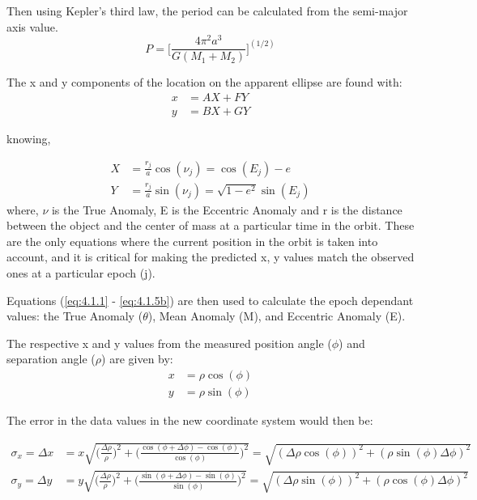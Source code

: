 \documentclass[10pt,preprint]{aastex}
\begin{document}
Then using Kepler's third law, the period can be calculated from the semi-major axis value.
\begin{equation}\label{eq:28}
P = \bigg[\frac{4\pi^2a^3}{G(M_1+M_2)} \bigg]^{(1/2)}
\end{equation}

The x and y components of the location on the apparent ellipse are found with:
\begin{subequations}
\begin{align}\label{eq:28-1a}
x& = AX+FY\\
\label{eq:28-1b}
y& = BX + GY
\end{align}
\end{subequations}

knowing,

\begin{subequations}
\begin{align}\label{eq:28-1.5a}
X& = \frac{r_j}{a}\cos(\nu_j) = \cos(E_j)-e\\
\label{eq:28-1.5b}
Y& = \frac{r_j}{a}\sin(\nu_j) = \sqrt{1-e^2}\sin(E_j) 
\end{align}
\end{subequations}
where, $\nu$ is the True Anomaly, E is the Eccentric Anomaly and r is the distance between the object and the center of mass at a particular time in the orbit.  These are the only equations where the current position in the orbit is taken into account, and it is critical for making the predicted x, y values match the observed ones at a particular epoch (j).

Equations (\ref{eq:4.1.1} - \ref{eq:4.1.5b}) are then used to calculate the epoch dependant values: the True Anomaly ($\theta$), Mean Anomaly (M), and Eccentric Anomaly (E).

The respective x and y values from the measured position angle ($\phi$) and separation angle ($\rho$) are given by:
\begin{subequations}
\begin{align}\label{eq:28-2a}
x& = \rho \cos(\phi)\\
\label{eq:28-2b}
y& = \rho \sin(\phi)
\end{align}
\end{subequations}

The error in the data values in the new coordinate system would then be:

\begin{subequations}
\begin{align}\label{eq:28-3a}
\sigma_{x}=\Delta x& = x \sqrt{\bigg(\frac{\Delta\rho}{\rho}\bigg)^2 +\bigg(\frac{\cos(\phi+\Delta\phi)-\cos(\phi)}{\cos(\phi)}\bigg)^2} = \sqrt{(\Delta \rho \cos(\phi))^2+(\rho \sin(\phi)\Delta \phi)^2}\\
\label{eq:28-3b}
\sigma_{y}=\Delta y& = y \sqrt{\bigg(\frac{\Delta\rho}{\rho}\bigg)^2 +\bigg(\frac{\sin(\phi+\Delta\phi)-\sin(\phi)}{\sin(\phi)}\bigg)^2} = \sqrt{(\Delta \rho \sin(\phi))^2+(\rho \cos(\phi)\Delta \phi)^2}
\end{align}
\end{subequations}
 
\end{document}
